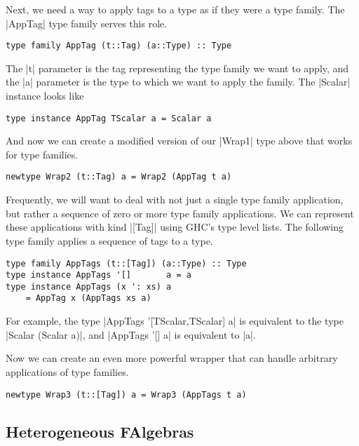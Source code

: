 \documentclass[preprint]{sigplanconf}
\theoremstyle{definition}
\begin{document}
Next, we need a way to apply tags to a type as if they were a type family.
The |AppTag| type family serves this role.
\begin{lstlisting}
type family AppTag (t::Tag) (a::Type) :: Type
\end{lstlisting}
The |t| parameter is the tag representing the type family we want to apply,
and the |a| parameter is the type to which we want to apply the family.
The |Scalar| instance looks like
\begin{lstlisting}
type instance AppTag TScalar a = Scalar a
\end{lstlisting}
And now we can create a modified version of our |Wrap1| type above that works for type families.
\begin{lstlisting}
newtype Wrap2 (t::Tag) a = Wrap2 (AppTag t a)
\end{lstlisting}

Frequently, we will want to deal with not just a single type family application,
but rather a sequence of zero or more type family applications.
We can represent these applications with kind |[Tag]| using GHC's type level lists.
The following type family applies a sequence of tags to a type.
\begin{lstlisting}
type family AppTags (t::[Tag]) (a::Type) :: Type
type instance AppTags '[]       a = a
type instance AppTags (x ': xs) a
    = AppTag x (AppTags xs a)
\end{lstlisting}
For example, the type
|AppTags '[TScalar,TScalar] a|
is equivalent to the type
|Scalar (Scalar a)|,
and
|AppTags '[] a| is equivalent to |a|.

Now we can create an even more powerful wrapper that can handle arbitrary applications of type families.
\begin{lstlisting}
newtype Wrap3 (t::[Tag]) a = Wrap3 (AppTags t a)
\end{lstlisting}

\subsection{Heterogeneous FAlgebras}
\end{document}
